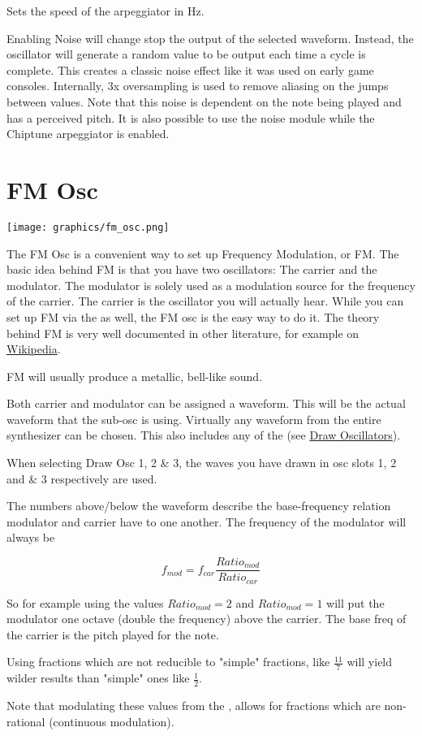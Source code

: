 {Sets the speed of the arpeggiator in Hz.}

{Enabling Noise will change stop the output of the selected waveform. Instead, the oscillator will generate a random value to be output each time a cycle is complete. This creates a classic noise effect like it was used on early game consoles. Internally, 3x oversampling is used to remove aliasing on the jumps between values. Note that this noise is dependent on the note being played and has a perceived pitch. It is also possible to use the noise module while the Chiptune arpeggiator is enabled.}

\section{FM Osc}
\label{fm_osc}
\begin{center}
    \texttt{[image: graphics/fm\_osc.png]}
\end{center}
The FM Osc is a convenient way to set up Frequency Modulation, or FM. The basic idea behind FM is that you have two oscillators: The carrier and the modulator. The modulator is solely used as a modulation source for the frequency of the carrier. The carrier is the oscillator you will actually hear. While you can set up FM via the \modmatrix as well, the FM osc is the easy way to do it. The theory behind FM is very well documented in other literature, for example on \hyperlink{https://de.wikipedia.org/wiki/FM-Synthese}{Wikipedia}.

FM will usually produce a metallic, bell-like sound.

{Both carrier and modulator can be assigned a waveform. This will be the actual waveform that the sub-osc is using. Virtually any waveform from the entire synthesizer can be chosen. This also includes any of the (see \hyperref[wavedraw]{Draw Oscillators}).

When selecting  Draw Osc 1, 2 \& 3, the waves you have drawn in osc slots 1, 2 and \& 3 respectively are used.}

{The numbers above/below the waveform describe the base-frequency relation modulator and carrier have to one another. The frequency of the modulator will always be

\begin{equation}
    f_{mod} = f_{car} \frac{Ratio_{mod}}{Ratio_{car}}
\end{equation}

So for example using the values $Ratio_{mod} = 2$ and $Ratio_{mod} = 1$ will put the modulator one octave (double the frequency) above the carrier. The base freq of the carrier is the pitch played for the note.

Using fractions which are not reducible to "simple" fractions, like $\frac{11}{7}$ will yield wilder results than "simple" ones like $\frac{1}{2}$.

Note that modulating these values from the \modmatrix, allows for fractions which are non-rational (continuous modulation).}


